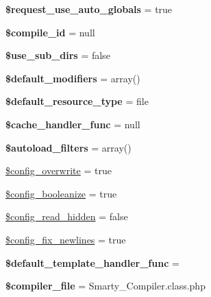 \begin{DoxyCompactItemize}
{\bfseries \$request\+\_\+use\+\_\+auto\+\_\+globals} = true
\item 
\mbox{\label{class_smarty_a4c29af6f98e3049de95861b01a7bb00d}} 
{\bfseries \$compile\+\_\+id} = null
\item 
\mbox{\label{class_smarty_a9d2c3aa18168752d2a32b5aac08b25cd}} 
{\bfseries \$use\+\_\+sub\+\_\+dirs} = false
\item 
\mbox{\label{class_smarty_a48ec112144d4921e3a31fb1a5526ad2f}} 
{\bfseries \$default\+\_\+modifiers} = array()
\item 
\mbox{\label{class_smarty_a35cf3764fb77e481ca92ef131a35ca7e}} 
{\bfseries \$default\+\_\+resource\+\_\+type} = \textquotesingle{}file\textquotesingle{}
\item 
\mbox{\label{class_smarty_a212fee0b84704db751e24b434177a478}} 
{\bfseries \$cache\+\_\+handler\+\_\+func} = null
\item 
\mbox{\label{class_smarty_aca2078dde09728b223cdffe8209e6dcc}} 
{\bfseries \$autoload\+\_\+filters} = array()
\item 
\mbox{\hyperlink{class_smarty_a728421c1493ea20b619459924184b06d}{\$config\+\_\+overwrite}} = true
\item 
\mbox{\hyperlink{class_smarty_ab3e274a6c3fd439b83380c17a71255bb}{\$config\+\_\+booleanize}} = true
\item 
\mbox{\hyperlink{class_smarty_add257cafa2cc7f2c68381f9bcc6f4d7b}{\$config\+\_\+read\+\_\+hidden}} = false
\item 
\mbox{\hyperlink{class_smarty_a4df07d516adb04c09b5f77b556d3b5bc}{\$config\+\_\+fix\+\_\+newlines}} = true
\item 
\mbox{\label{class_smarty_a9ff3231160bde6632ca8ad252918e3f0}} 
{\bfseries \$default\+\_\+template\+\_\+handler\+\_\+func} = \textquotesingle{}\textquotesingle{}
\item 
\mbox{\label{class_smarty_a5912fff45f8fdf37cf48552ee9444323}} 
{\bfseries \$compiler\+\_\+file} = \textquotesingle{}Smarty\+\_\+\+Compiler.\+class.\+php\textquotesingle{}
\item 
\mbox{\label{class_smarty_a7696818dcf593c5f9471d7f76ea2e645}} 

\end{DoxyCompactItemize}
